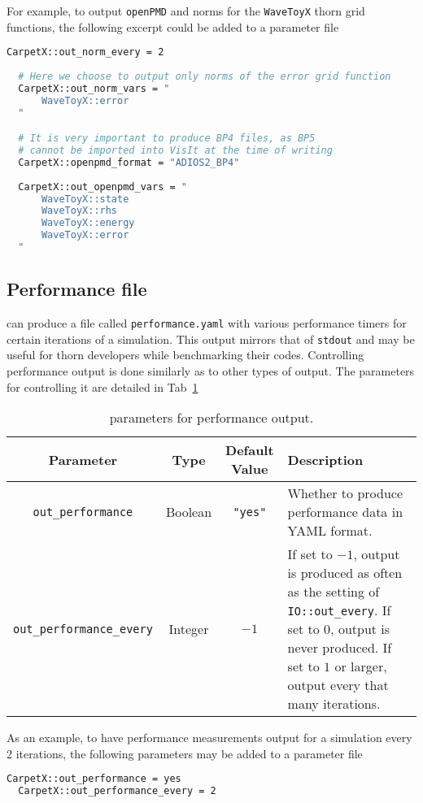 For example, to output \texttt{openPMD} and norms for the \texttt{WaveToyX} thorn grid functions, the following excerpt could be added to a parameter file

\begin{lstlisting}[language=bash]
  CarpetX::out_norm_every = 2
  
  # Here we choose to output only norms of the error grid function    
  CarpetX::out_norm_vars = "
      WaveToyX::error
  "

  # It is very important to produce BP4 files, as BP5
  # cannot be imported into VisIt at the time of writing
  CarpetX::openpmd_format = "ADIOS2_BP4"
  
  CarpetX::out_openpmd_vars = "
      WaveToyX::state
      WaveToyX::rhs
      WaveToyX::energy
      WaveToyX::error
  "
\end{lstlisting}

\subsection{Performance file}

\CarpetX\space can produce a file called \texttt{performance.yaml} with various performance timers for certain iterations of a simulation. This output mirrors that of \texttt{stdout} and may be useful for thorn developers while benchmarking their codes. Controlling performance output is done similarly as to other types of output. The parameters for controlling it are detailed in Tab~\ref{tab:perf_output}

\begin{table}[ht]
  \centering
  \begin{tabularx}{\textwidth}{cccX}
    Parameter                       & Type     & Default Value  & Description \\\hline\hline
    \texttt{out\_performance}        & Boolean & \texttt{"yes"} & Whether to produce performance data in YAML format. \\
    \texttt{out\_performance\_every} & Integer & $-1$           & If set to $-1$, output is produced as often as the setting of \texttt{IO::out\_every}. If set to $0$, output is never produced. If set to $1$ or larger, output every that many iterations. \\\hline\hline
  \end{tabularx}
  \label{tab:perf_output}
  \caption{\CarpetX\space parameters for performance output.}
\end{table}

As an example, to  have performance measurements output for a simulation every 2 iterations, the following parameters may be added to a parameter file

\begin{lstlisting}[language=bash]
  CarpetX::out_performance = yes  
  CarpetX::out_performance_every = 2
\end{lstlisting}
